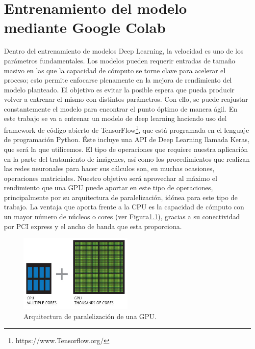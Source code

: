 \mbox{}


\chapter{Entrenamiento del modelo mediante Google Colab}
\label{ch:chapter2}
Dentro del entrenamiento de modelos Deep Learning, la velocidad es uno de los parámetros fundamentales.
Los modelos pueden requerir entradas de tamaño masivo en las que la capacidad de cómputo se torne clave para acelerar el proceso;
esto permite enfocarse plenamente en la mejora de rendimiento del modelo planteado.
El objetivo es evitar la posible espera que pueda producir volver a entrenar el mismo con distintos parámetros.
Con ello, se puede reajustar constantemente el modelo para encontrar el punto óptimo de manera ágil.
En este trabajo se va a entrenar un modelo de deep learning haciendo uso del framework de código abierto de TensorFlow\footnote{https://www.Tensorflow.org/}, que está programada en el lenguaje de programación Python.
Éste incluye una API de Deep Learning llamada Keras, que será la que utilicemos.
El tipo de operaciones que requiere nuestra aplicación en la parte del tratamiento de imágenes, así como los procedimientos que realizan las redes neuronales para hacer sus cálculos son, en muchas ocasiones,
operaciones matriciales.
Nuestro objetivo será aprovechar al máximo el rendimiento que una GPU puede aportar en este tipo de operaciones, principalmente por su arquitectura de paralelización, idónea para este tipo de trabajo.
La ventaja que aporta frente a la CPU es la capacidad de cómputo con un mayor número de núcleos o cores (ver Figura\ref{fig:Arquitectura de paralelización de una GPU}), gracias a su conectividad por PCI express y el ancho de banda que esta proporciona.

\begin{figure}
    \centering
    \includegraphics[width=0.5\textwidth]{images/chapter2/cpu-and-gpu.jpg}
    \caption{Arquitectura de paralelización de una GPU.}
    \label{fig:Arquitectura de paralelización de una GPU}
\end{figure}


